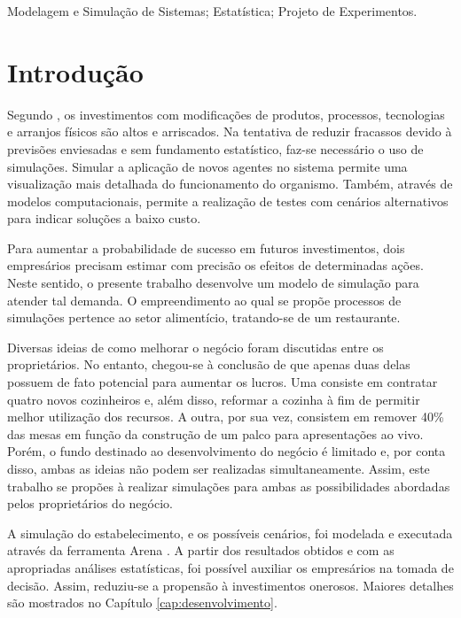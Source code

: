 \documentclass[pt,disc,oneside]{ufscpgeasthesis}
\begin{document}
   \begin{keywords}
      Modelagem e Simulação de Sistemas; Estatística; Projeto de Experimentos.
   \end{keywords}

   \mainmatter

	\chapter{Introdução}
	\label{cap:introducao}

		Segundo \cite{Pereira2012}, os investimentos com modificações de produtos, processos, tecnologias e arranjos físicos são altos e arriscados.
		Na tentativa de reduzir fracassos devido à previsões enviesadas e sem fundamento estatístico, faz-se necessário o uso de simulações.
		Simular a aplicação de novos agentes no sistema permite uma visualização mais detalhada do funcionamento do organismo.
		Também, através de modelos computacionais, permite a realização de testes com cenários alternativos para indicar soluções a baixo custo.

		Para aumentar a probabilidade de sucesso em futuros investimentos, dois empresários precisam estimar com precisão os efeitos de determinadas ações.
		Neste sentido, o presente trabalho desenvolve um modelo de simulação para atender tal demanda.
		O empreendimento ao qual se propõe processos de simulações pertence ao setor alimentício, tratando-se de um restaurante.

		Diversas ideias de como melhorar o negócio foram discutidas entre os proprietários.
		No entanto, chegou-se à conclusão de que apenas duas delas possuem de fato potencial para aumentar os lucros.
		Uma consiste em contratar quatro novos cozinheiros e, além disso, reformar a cozinha à fim de permitir melhor utilização dos recursos.
		A outra, por sua vez, consistem em remover 40\% das mesas em função da construção de um palco para apresentações ao vivo.
		Porém, o fundo destinado ao desenvolvimento do negócio é limitado e, por conta disso, ambas as ideias não podem ser realizadas simultaneamente.
		Assim, este trabalho se propões à realizar simulações para ambas as possibilidades abordadas pelos proprietários do negócio.

		A simulação do estabelecimento, e os possíveis cenários, foi modelada e executada através da ferramenta Arena \cite{Arena}.
		A partir dos resultados obtidos e com as apropriadas análises estatísticas, foi possível auxiliar os empresários na tomada de decisão.
		Assim, reduziu-se a propensão à investimentos onerosos.
		Maiores detalhes são mostrados no Capítulo \ref{cap:desenvolvimento}.
\end{document}

